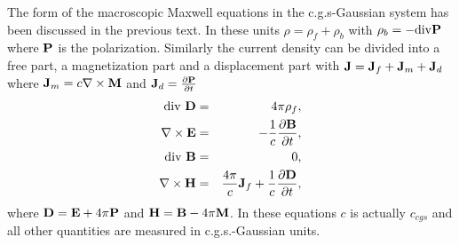 \documentclass[12pt,a4paper]{article}
\begin{document}
{\color{orange} The form of the macroscopic Maxwell equations
in the c.g.s-Gaussian system has been discussed in the previous text.
In these units $\rho=\rho_f+\rho_b$ with $\rho_b=-{\rm div} {\bf P}$
where ${\bf P}$ is the polarization.
Similarly the current density can be divided into a free part, a 
magnetization part
and a displacement part with ${\bf J}={\bf J}_f + {\bf J}_m + {\bf J}_d$ where
${\bf J}_m=c \nabla \times {\bf M}$ and ${\bf J}_d={\partial {\bf P}\over 
\partial t}$
\begin{eqnarray}
{\rm div}\ {\bf D} &=& 4 \pi \rho_f, \\
\nabla \times {\bf E} &=& -{1\over c} {\partial {\bf B} \over \partial t}, \\
{\rm div}\  {\bf B} &=& 0, \\
\nabla \times {\bf H} &=& {4 \pi \over c} {\bf J}_f+ {1\over c}
{\partial {\bf D} \over \partial t}, 
\end{eqnarray}
where ${\bf D}={\bf E} + 4 \pi {\bf P}$ and ${\bf H}={\bf B}- 4 \pi {\bf M}$.
In these equations $c$ is actually $c_{cgs}$ and all 
other quantities are measured in c.g.s.-Gaussian units.
}

\newpage
\end{document}

